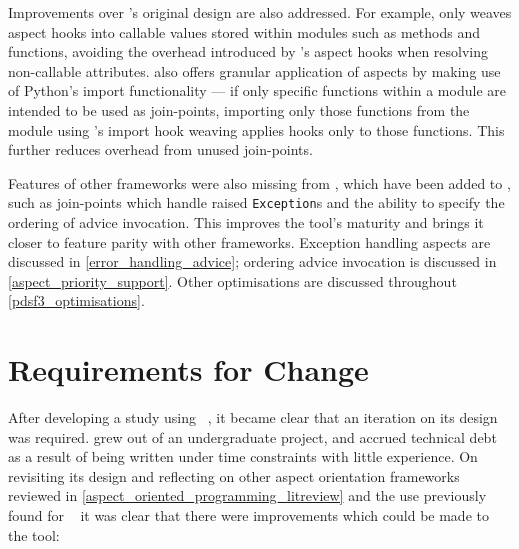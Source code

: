 Improvements over \pydysofu{}'s original design are also addressed. For example,
\pdsfthree only weaves aspect hooks into callable values stored within modules
such as methods and functions, avoiding the overhead introduced by \pydysofu{}'s
aspect hooks when resolving non-callable attributes. \pdsfthree also offers
granular application of aspects by making use of Python's import functionality
--- if only specific functions within a module are intended to be used as
join-points, importing only those functions from the module using \pdsfthree{}'s
import hook weaving applies hooks only to those functions. This further reduces
overhead from unused join-points.

Features of other \aop{} frameworks were also missing from \pydysofu{}, which
have been added to \pdsfthree{}, such as join-points which handle raised
\lstinline{Exception}s and the ability to specify the ordering of advice
invocation. This improves the tool's maturity and brings it closer to feature
parity with other \aop{} frameworks. Exception handling aspects are discussed in
\cref{error_handling_advice}; ordering advice invocation is discussed in
\cref{aspect_priority_support}. Other optimisations are discussed throughout
\cref{pdsf3_optimisations}.








\section{Requirements for Change}\label{sec:pdsf3requirements}

After developing a study using \pydysofu{}~\cite{wallis2018caise}, it became clear that an iteration on its
design was required. \pydysofu{} grew out of an undergraduate project, and accrued
technical debt as a result of being written under time constraints with little
experience. On revisiting its design and reflecting on other aspect orientation
frameworks reviewed in  
\cref{aspect_oriented_programming_litreview} and the use previously found for
\pydysofu{}~\cite{wallis2018caise,wallis2018genetic} it was clear that there were
improvements which could be made to the tool:

